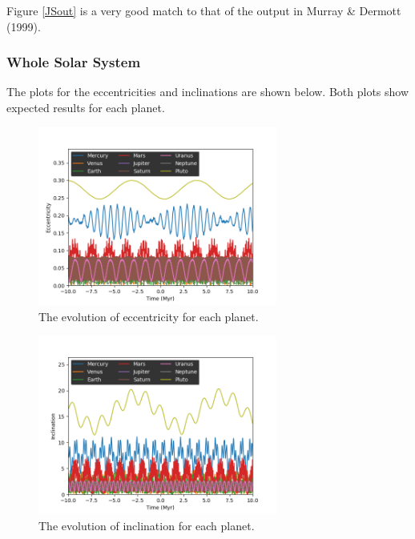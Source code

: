 \documentclass[11pt, oneside]{article}   	%
\begin{document}
Figure \ref{JSout} is a very good match to that of the output in Murray \& Dermott (1999)\cite{ssd}.

\subsubsection{Whole Solar System}

The plots for the eccentricities and inclinations are shown below. Both plots show expected results for each planet.

\begin{figure}[!h]
\begin{center}
\includegraphics[width= 0.7\textwidth]{All_eccentricities.png}
\caption[]{The evolution of eccentricity for each planet.}
\label{}
\end{center}
\end{figure}
\begin{figure}[!h]
\begin{center}
\includegraphics[width= 0.7\textwidth]{All_Inclinations.png}
\caption[]{The evolution of inclination for each planet.}
\label{}
\end{center}
\end{figure}
\end{document}
